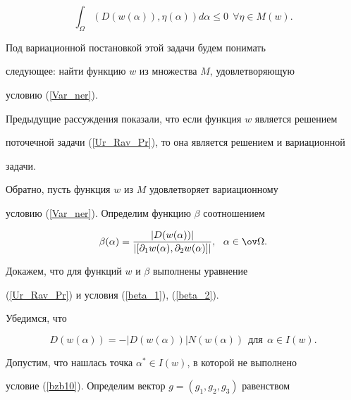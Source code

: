 \begin{equation} 


\int_\Omega ( {D (w(\alpha )), \eta (\alpha )} ) d \alpha 


\leq 0 \ \ \forall \eta \in M(w) . 


\label{Var_ner}


\end{equation}


Под вариационной постановкой этой задачи будем понимать


следующее: найти функцию $w$ из множества $M$, удовлетворяющую


условию (\ref{Var_ner}).


Предыдущие рассуждения показали, что если функция $w$ является решением


поточечной задачи (\ref{Ur_Rav_Pr}), то она является решением и вариационной


задачи.


Обратно, пусть функция $w$ из $M$ удовлетворяет вариационному


условию (\ref{Var_ner}). Определим функцию $\beta$ соотношением


\begin{equation}


\beta (\alpha )=\frac {| D(w(\alpha )) |}


{| [\partial_1 w(\alpha),\partial_2 w(\alpha) ] |},


\ \ \alpha \in \ov\Omega . 


\label{bzb9}


\end{equation}





Докажем, что для функций $w$ и $\beta$ выполнены уравнение


(\ref{Ur_Rav_Pr}) и условия (\ref{beta_1}), (\ref{beta_2}).


Убедимся, что 


\begin{equation} 


D(w(\alpha ))=- |D(w(\alpha )) | N(w(\alpha ))


\ \ \text{для}\ \ \alpha \in I(w) . 


\label{bzb10}


\end{equation}


Допустим, что нашлась точка $\alpha^* \in I(w) $, в которой не выполнено 


условие (\ref{bzb10}). Определим вектор $g=(g_1, g_2, g_3)$ равенством


